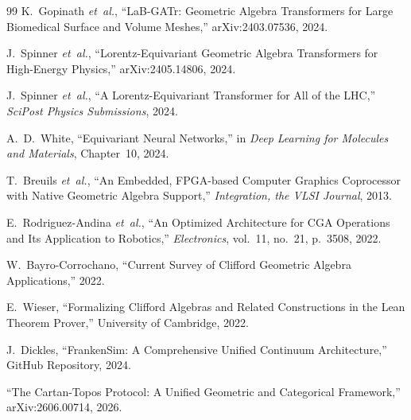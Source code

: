 \documentclass[manuscript, nonacm, review=false]{acmart}
\theoremstyle{definition}
\theoremstyle{plain}
\begin{document}
\begin{thebibliography}{99}
K.~Gopinath \emph{et~al.}, ``LaB-GATr: Geometric Algebra Transformers for Large Biomedical Surface and Volume Meshes,'' arXiv:2403.07536, 2024.

J.~Spinner \emph{et~al.}, ``Lorentz-Equivariant Geometric Algebra Transformers for High-Energy Physics,'' arXiv:2405.14806, 2024.

J.~Spinner \emph{et~al.}, ``A Lorentz-Equivariant Transformer for All of the LHC,'' \emph{SciPost Physics Submissions}, 2024.

A.~D.~White, ``Equivariant Neural Networks,'' in \emph{Deep Learning for Molecules and Materials}, Chapter~10, 2024.

T.~Breuils \emph{et~al.}, ``An Embedded, FPGA-based Computer Graphics Coprocessor with Native Geometric Algebra Support,'' \emph{Integration, the VLSI Journal}, 2013.

E.~Rodriguez-Andina \emph{et~al.}, ``An Optimized Architecture for CGA Operations and Its Application to Robotics,'' \emph{Electronics}, vol.~11, no.~21, p.~3508, 2022.

W.~Bayro-Corrochano, ``Current Survey of Clifford Geometric Algebra Applications,'' 2022.

E.~Wieser, ``Formalizing Clifford Algebras and Related Constructions in the Lean Theorem Prover,'' University of Cambridge, 2022.

J.~Dickles, ``FrankenSim: A Comprehensive Unified Continuum Architecture,'' GitHub Repository, 2024.

``The Cartan-Topos Protocol: A Unified Geometric and Categorical Framework,'' arXiv:2606.00714, 2026.

\end{thebibliography}
\end{document}
